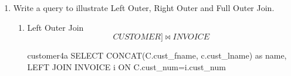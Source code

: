 \begin{enumerate}
	      \begin{enumerate}
		      \item Relational Algebra

		            \begin{multline*}
			            \pi_{\text{cust\_lname} + " " + \text{cust\_fname}} (\sigma_{\text{unit\_sold} \geq  3} \\
			            (CUSTOMER \bowtie \sigma_{\text{unit\_sold}}\\
			            ({}_{\text{cust\_num, inv\_date} > \text{prod\_num}} \; \mathcal{F}_{\; sum(\text{unit\_sold})} (INVOICE))))
		            \end{multline*}

		      \item SQL

		            \begin{sqlQuery}{customers3}
                        SELECT concat(cust_lname , ' ' , cust_fname) as name
                        FROM CUSTOMERS
                        WHERE cust_num IN
                        (
                            SELECT cust_num
                            FROM INVOICE
                            GROUP BY cust_num, inv_date, prod_num
                            HAVING sum(unit_sold) >= 3
                        );
                    \end{sqlQuery}
		            \pagebreak

		      \item Output

		            \begin{lstlisting}[style=output]
practicals=# \i /home/sql/customers3.sql
    name    
------------
 Smith John
 Jones Mary
(2 rows)
                    \end{lstlisting}

	      \end{enumerate}

	\item Write a query to illustrate Left Outer, Right Outer and Full Outer Join.

	      \begin{enumerate}
		      \item Left Outer Join
		            \begin{equation*}
			            CUSTOMER ]\bowtie INVOICE
		            \end{equation*}

		            \begin{sqlQuery}{customer4a}
											SELECT CONCAT(C.cust_fname, c.cust_lname) as name,
											LEFT JOIN INVOICE i
											ON C.cust_num=i.cust_num
										\end{sqlQuery}


\end{enumerate}
\end{enumerate}
